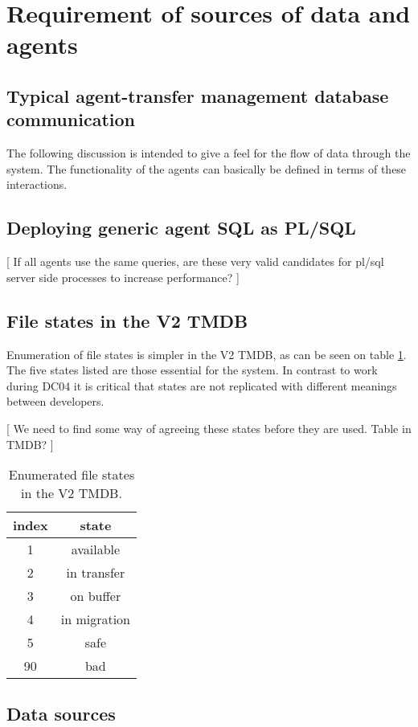 \documentclass{cmspaper}
\begin{document}
\section{Requirement of sources of data and agents}
\subsection{Typical agent-transfer management database communication}
The following discussion is intended to give a feel for the flow
of data through the system. The functionality of the agents can basically be defined in terms of these interactions.

\subsection{Deploying generic agent SQL as PL/SQL}
[ If all agents use the same queries, are these very valid candidates for pl/sql server side processes to increase performance? ]

\subsection{File states in the V2 TMDB}
Enumeration of file states is simpler in the V2 TMDB, as can be seen on table \ref{table:states}. The five states listed are those essential for the system. In contrast to work during DC04 it is critical that states are not replicated with different meanings between developers. 

[ We need to find some way of agreeing these states before they are used. Table in TMDB? ]

\begin{table}
\centering
\begin{tabular}[!h]{|c|c|} 
\hline index & state
\\ \hline
	1	& 	available
\\ 	2	&	in transfer
\\	3	&	on buffer
\\	4	&	in migration
\\	5	&	safe
\\	90	&	bad
\\ \hline
\end{tabular}
\caption{Enumerated file states in the V2 TMDB.}
\label{table:states}
\end{table}

\subsection{Data sources}
\end{document}
